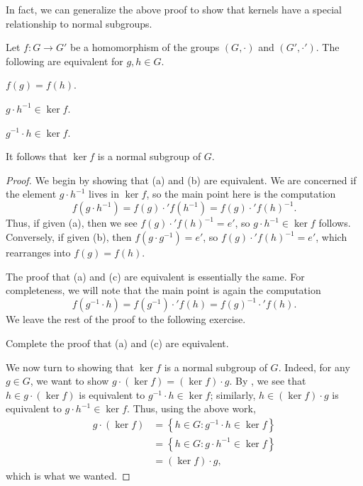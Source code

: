 \documentclass[../main.tex]{subfiles}
\begin{document}
In fact, we can generalize the above proof to show that kernels have a special relationship to normal subgroups.
\begin{proposition} \label{prop:ker-normal}
    Let $f\colon G\to G'$ be a homomorphism of the groups $(G,\cdot)$ and $(G',\cdot')$. The following are equivalent for $g,h\in G$.
    \begin{listalph}
        \item $f(g)=f(h)$.
        \item $g\cdot h^{-1}\in\ker f$.
        \item $g^{-1}\cdot h\in\ker f$.
    \end{listalph}
    It follows that $\ker f$ is a normal subgroup of $G$.
\end{proposition}
\begin{proof}
    We begin by showing that (a) and (b) are equivalent. We are concerned if the element $g\cdot h^{-1}$ lives in $\ker f$, so the main point here is the computation
    \[f\left(g\cdot h^{-1}\right)=f(g)\cdot'f\left(h^{-1}\right)=f(g)\cdot'f(h)^{-1}.\]
    Thus, if given (a), then we see $f(g)\cdot'f(h)^{-1}=e'$, so $g\cdot h^{-1}\in\ker f$ follows. Conversely, if given (b), then $f\left(g\cdot g^{-1}\right)=e'$, so $f(g)\cdot'f(h)^{-1}=e'$, which rearranges into $f(g)=f(h)$.
    
    The proof that (a) and (c) are equivalent is essentially the same. For completeness, we will note that the main point is again the computation
    \[f\left(g^{-1}\cdot h\right)=f\left(g^{-1}\right)\cdot'f(h)=f(g)^{-1}\cdot'f(h).\]
    We leave the rest of the proof to the following exercise.
    \begin{exe}
        Complete the proof that (a) and (c) are equivalent.
    \end{exe}
    We now turn to showing that $\ker f$ is a normal subgroup of $G$. Indeed, for any $g\in G$, we want to show $g\cdot(\ker f)=(\ker f)\cdot g$. By , we see that $h\in g\cdot(\ker f)$ is equivalent to $g^{-1}\cdot h\in\ker f$; similarly, $h\in(\ker f)\cdot g$ is equivalent to $g\cdot h^{-1}\in\ker f$. Thus, using the above work,
    \begin{align*}
        g\cdot(\ker f) &= \left\{h\in G:g^{-1}\cdot h\in\ker f\right\} \\
        &= \left\{h\in G:g\cdot h^{-1}\in\ker f\right\} \\
        &= (\ker f)\cdot g,
    \end{align*}
    which is what we wanted.
\end{proof}
\end{document}

